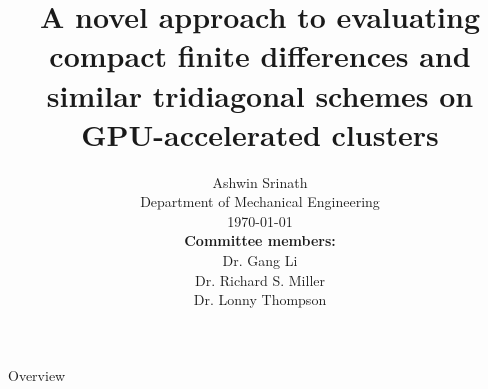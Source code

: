\documentclass[10pt]{beamer}
\begin{document}
\title[Compact finite differences on GPUs]
{A novel approach to evaluating 
compact finite differences 
and similar tridiagonal schemes on GPU-accelerated clusters}


\author[Ashwin Srinath]{
        Ashwin Srinath\\
        Department of Mechanical Engineering\\
        \today \newline \\
        \textbf{Committee members:} \\
        Dr. Gang Li \\
        Dr. Richard S. Miller \\
    Dr. Lonny Thompson}
\date{}
\titlepage

\begin{frame}{Overview}
    \tableofcontents
\end{frame}






\end{document}
